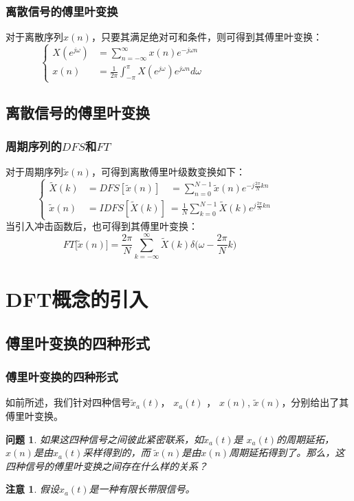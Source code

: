 \documentclass[notheorems,compress,mathserif,table]{beamer}
\newtheorem{zhuyi}{注意}
\newtheorem{wenti}{问题}
\begin{document}
\begin{frame}[shrink]\frametitle{离散信号的傅里叶变换}%
  对于离散序列$ x(n) $，只要其满足绝对可和条件，则可得到其傅里叶变换：
    $$
    \left\{ \begin{aligned}
         X(e^{j\omega}) &=\sum_{n=-\infty}^{\infty}x(n)e^{-j\omega n} \qquad\qquad\qquad\qquad\qquad\qquad \\
          x(n)        &=\frac{1}{2\pi}\int_{-\pi}^{\pi}X(e^{j\omega})e^{j\omega n}d\omega
    \end{aligned} \right.
    $$


\end{frame}

\subsection{离散信号的傅里叶变换}
\begin{frame}[shrink]\frametitle{周期序列的$DFS$和$FT$}%
 对于周期序列$ \tilde{x}(n)  $，可得到离散傅里叶级数变换如下：
	\begin{equation*}
	\left\{ \begin{aligned}
	\tilde{X}(k) &= DFS[\tilde{x}(n)]\quad  =  \sum_{n=0}^{N-1}\tilde{x}(n)e^{-j\frac{2\pi}{N}kn} \qquad\qquad\quad\\
	\tilde{x}(n) &= IDFS[\tilde{X}(k)]\:      	= \frac{1}{N}\sum_{k=0}^{N-1}\tilde{X}(k)e^{j\frac{2\pi}{N}kn}
	\end{aligned} \right.
	\end{equation*}
	当引入冲击函数后，也可得到其傅里叶变换：
	$$FT\big[\tilde{x}(n)\big] = \frac{2\pi}{N}\sum_{k=-\infty}^{\infty}\tilde{X}(k)\delta\big(\omega-\frac{2\pi}{N}k\big) \qquad\qquad\qquad$$

\end{frame}



\section{DFT概念的引入}
%
\subsection{傅里叶变换的四种形式}
\begin{frame}[shrink]\frametitle{傅里叶变换的四种形式}%

如前所述，我们针对四种信号$\tilde{x}_a(t)$，  $x_a(t) $ ， $ x(n)$, $\tilde{x}(n) $，分别给出了其傅里叶变换。
\begin{wenti}
    如果这四种信号之间彼此紧密联系，如$\tilde{x}_a(t)$是 $x_a(t) $的周期延拓，$ x(n)$是由$x_a(t) $采样得到的，而 $\tilde{x}(n)$是由$ x(n)$周期延拓得到了。那么，这四种信号的傅里叶变换之间存在什么样的关系？
\end{wenti}

\begin{zhuyi}
	{\heiti 假设$x_a(t) $是一种有限长带限信号。}
\end{zhuyi}



\end{frame}
\end{document}
